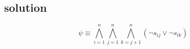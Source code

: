 \subsection{solution}


$$\psi \equiv \bigwedge_{i=1}^{n}\bigwedge_{j=1}^{n}\bigwedge_{k=j+1}^{n}(\neg s_{ij} \vee \neg s_{ik})$$